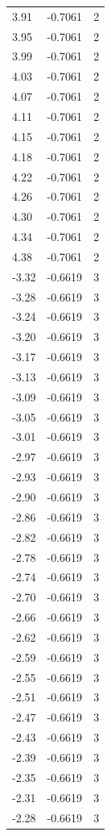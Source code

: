 \begin{longtable}{lrr}
  3.91 & -0.7061 & 2 \\
  3.95 & -0.7061 & 2 \\
  3.99 & -0.7061 & 2 \\
  4.03 & -0.7061 & 2 \\
  4.07 & -0.7061 & 2 \\
  4.11 & -0.7061 & 2 \\
  4.15 & -0.7061 & 2 \\
  4.18 & -0.7061 & 2 \\
  4.22 & -0.7061 & 2 \\
  4.26 & -0.7061 & 2 \\
  4.30 & -0.7061 & 2 \\
  4.34 & -0.7061 & 2 \\
  4.38 & -0.7061 & 2 \\
  -3.32 & -0.6619 & 3 \\
  -3.28 & -0.6619 & 3 \\
  -3.24 & -0.6619 & 3 \\
  -3.20 & -0.6619 & 3 \\
  -3.17 & -0.6619 & 3 \\
  -3.13 & -0.6619 & 3 \\
  -3.09 & -0.6619 & 3 \\
  -3.05 & -0.6619 & 3 \\
  -3.01 & -0.6619 & 3 \\
  -2.97 & -0.6619 & 3 \\
  -2.93 & -0.6619 & 3 \\
  -2.90 & -0.6619 & 3 \\
  -2.86 & -0.6619 & 3 \\
  -2.82 & -0.6619 & 3 \\
  -2.78 & -0.6619 & 3 \\
  -2.74 & -0.6619 & 3 \\
  -2.70 & -0.6619 & 3 \\
  -2.66 & -0.6619 & 3 \\
  -2.62 & -0.6619 & 3 \\
  -2.59 & -0.6619 & 3 \\
  -2.55 & -0.6619 & 3 \\
  -2.51 & -0.6619 & 3 \\
  -2.47 & -0.6619 & 3 \\
  -2.43 & -0.6619 & 3 \\
  -2.39 & -0.6619 & 3 \\
  -2.35 & -0.6619 & 3 \\
  -2.31 & -0.6619 & 3 \\
  -2.28 & -0.6619 & 3 \\

\end{longtable}
